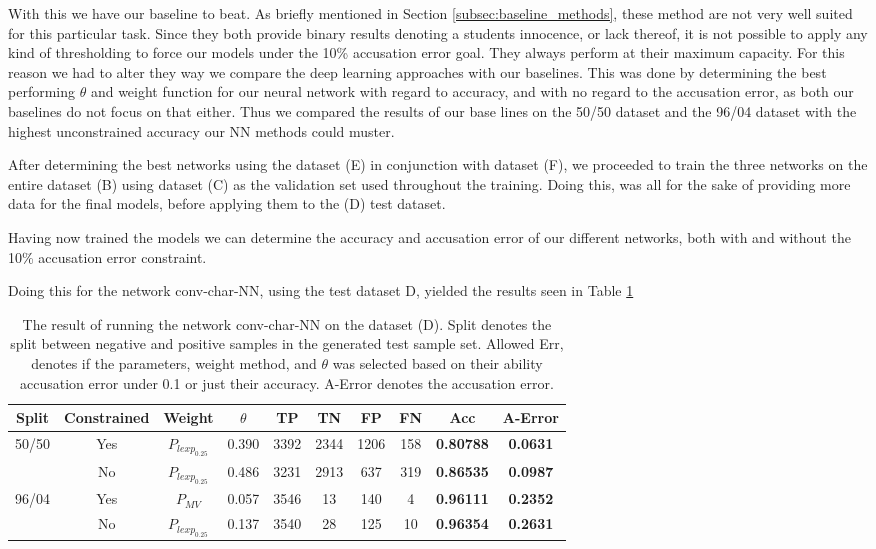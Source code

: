 With this we have our baseline to beat. As briefly mentioned in Section
\ref{subsec:baseline_methods}, these method are not very well suited for this
particular task. Since they both provide binary results denoting a students
innocence, or lack thereof, it is not possible to apply any kind of thresholding
to force our models under the 10\% accusation error goal. They always perform at
their maximum capacity. For this reason we had to alter they way we compare the
deep learning approaches with our baselines. This was done by determining the
best performing $\theta$ and weight function for our neural network with regard
to accuracy, and with no regard to the accusation error, as both our baselines
do not focus on that either. Thus we compared the results of our base lines on
the 50/50 dataset and the 96/04 dataset with the highest unconstrained accuracy
our \gls{NN} methods could muster.

After determining the best networks using the dataset (E) in conjunction with
dataset (F), we proceeded to train the three networks on the entire dataset (B)
using dataset (C) as the validation set used throughout the training. Doing
this, was all for the sake of providing more data for the final models, before
applying them to the (D) test dataset.

Having now trained the models we can determine the accuracy and accusation
error of our different networks, both with and without the 10\% accusation error
constraint.

Doing this for the network \gls{conv-char-NN}, using the test dataset D, yielded
the results seen in Table \ref{tab:char_CNN_res}

\begin{table}[]
\begin{tabular}{|c|c|c|c|c|c|c|c||c|c|}
\hline
Split & Constrained & Weight & $\theta$ & TP & TN & FP & FN & \textbf{Acc} & \textbf{A-Error} \\ \hline
\multirow{2}{*}{50/50} & Yes & $P_{lexp_{0.25}}$ & 0.390 & 3392 & 2344 & 1206 & 158 & \textbf{0.80788} & \textbf{0.0631} \\ \cline{2-10} 
 & No & $P_{lexp_{0.25}}$ & 0.486 & 3231 & 2913 & 637 & 319 & \textbf{0.86535} & \textbf{0.0987} \\ \hline
\multirow{2}{*}{96/04} & Yes & $P_{MV}$ & 0.057 & 3546 & 13 & 140 & 4 & \textbf{0.96111} & \textbf{0.2352} \\ \cline{2-10} 
 & No & $P_{lexp_{0.25}}$ & 0.137 & 3540 & 28 & 125 & 10 & \textbf{0.96354} & \textbf{0.2631} \\ \hline
\end{tabular}
\caption{The result of running the network \gls{conv-char-NN} on the dataset
(D). Split denotes the split between negative and positive samples in the
generated test sample set. Allowed Err, denotes if the parameters, weight
method, and $\theta$ was selected based on their ability accusation error under
0.1 or just their accuracy. A-Error denotes the accusation error.}
\label{tab:char_CNN_res}
\end{table}

